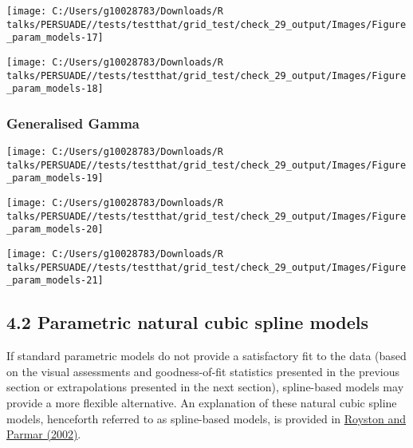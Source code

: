 \documentclass[
]{article}
\begin{document}
\begin{flushleft}\texttt{[image: C:/Users/g10028783/Downloads/R talks/PERSUADE//tests/testthat/grid\_test/check\_29\_output/Images/Figure\_param\_models-17]} \end{flushleft}

\begin{flushleft}\texttt{[image: C:/Users/g10028783/Downloads/R talks/PERSUADE//tests/testthat/grid\_test/check\_29\_output/Images/Figure\_param\_models-18]} \end{flushleft}

\clearpage

\subsubsection{Generalised Gamma}\label{generalised-gamma}

\begin{flushleft}\texttt{[image: C:/Users/g10028783/Downloads/R talks/PERSUADE//tests/testthat/grid\_test/check\_29\_output/Images/Figure\_param\_models-19]} \end{flushleft}

\begin{flushleft}\texttt{[image: C:/Users/g10028783/Downloads/R talks/PERSUADE//tests/testthat/grid\_test/check\_29\_output/Images/Figure\_param\_models-20]} \end{flushleft}

\begin{flushleft}\texttt{[image: C:/Users/g10028783/Downloads/R talks/PERSUADE//tests/testthat/grid\_test/check\_29\_output/Images/Figure\_param\_models-21]} \end{flushleft}

\clearpage

\subsection{4.2 Parametric natural cubic spline
models}\label{parametric-natural-cubic-spline-models}

If standard parametric models do not provide a satisfactory fit to the
data (based on the visual assessments and goodness-of-fit statistics
presented in the previous section or extrapolations presented in the
next section), spline-based models may provide a more flexible
alternative. An explanation of these natural cubic spline models,
henceforth referred to as spline-based models, is provided in
\href{https://doi.org/10.1002/sim.1203}{Royston and Parmar (2002)}.
\end{document}
